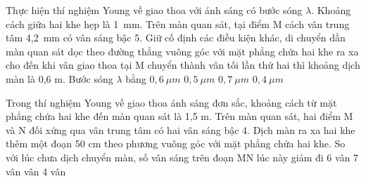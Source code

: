 \begin{vidu}%
 Thực hiện thí nghiệm Young về giao thoa với ánh sáng có bước sóng $\lambda$. Khoảng cách giữa hai khe hẹp là 1\ mm. Trên màn quan sát, tại điểm M cách vân trung tâm 4,2\ mm có vân sáng bậc 5. Giữ cố định các điều kiện khác, di chuyển dần màn quan sát dọc theo đường thẳng vuông góc với mặt phẳng chứa hai khe ra xa cho đến khi vân giao thoa tại M chuyển thành vân tối lần thứ hai thì khoảng dịch màn là 0,6 m. Bước sóng $\lambda$ bằng
\choice
{\True $0,6\ \mu m$}
{$0,5\ \mu m$}
{$0,7\ \mu m$}
{$0,4\ \mu m$}
\end{vidu} %
\begin{vidu}%
 Trong thí nghiệm Young về giao thoa ánh sáng đơn sắc, khoảng cách từ mặt phẳng chứa hai khe đến màn quan sát là 1,5 m. Trên màn quan sát, hai điểm M và N đối xứng qua vân trung tâm có hai vân sáng bậc 4. Dịch màn ra xa hai khe thêm một đoạn 50 cm theo phương vuông góc với mặt phẳng chứa hai khe. So với lúc chưa dịch chuyển màn, số vân sáng trên đoạn MN lúc này giảm đi
\choice
{6 vân}
{7 vân}
{ vân}
{4 vân}
\end{vidu} %
